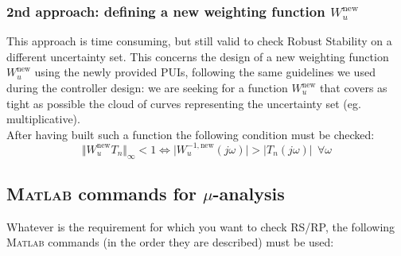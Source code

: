 \documentclass[a4paper, 12pt]{article}
\begin{document}
\subsubsection{2nd approach: defining a new weighting function $W_u^{\text{new}}$}
This approach is time consuming, but still valid to check Robust Stability on a different uncertainty set. This concerns the design of a new weighting function $W_u^{\text{new}}$ using the newly provided PUIs, following the same guidelines we used during the controller design: we are seeking for a function $W_u^{\text{new}}$ that covers as tight as possible the cloud of curves representing the uncertainty set (eg. multiplicative).\\
After having built such a function the following condition must be checked: 
\begin{equation}
    \Vert W_u^{\text{new}} T_n \Vert_\infty < 1 \iff 
    \vert W_u^{-1,\text{new}}(j\omega) \vert > \vert T_n (j\omega)\vert \ \  \forall \omega
\end{equation}

\subsection{\textsc{Matlab} commands for $\mu$-analysis}
Whatever is the requirement for which you want to check RS/RP, the following \textsc{Matlab} commands (in the order they are described) must be used: 
\end{document}

